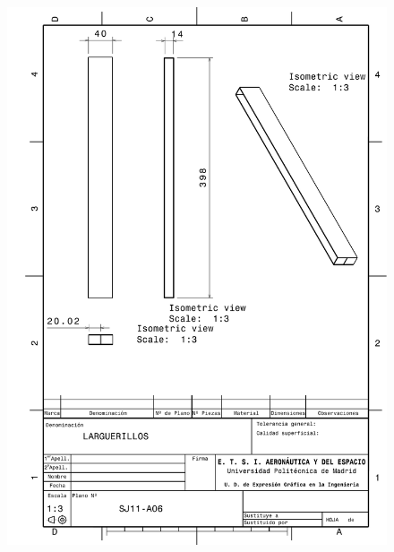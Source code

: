 \begin{figure}
    \centering
    \includegraphics[width=\linewidth]{Figures//Planos/L.pdf}
\end{figure}

